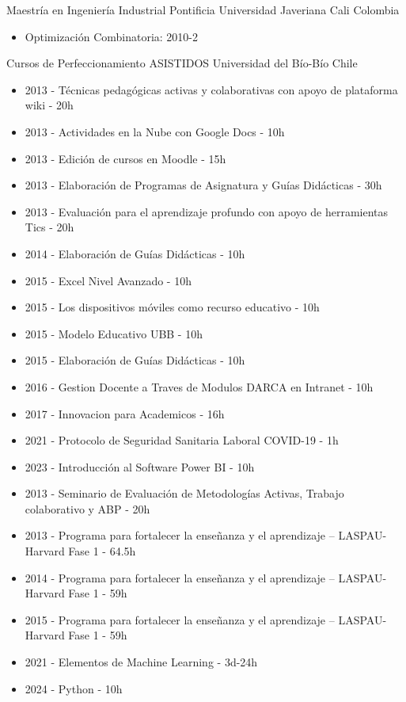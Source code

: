 
{Maestr\'ia en Ingenier\'ia Industrial}
{Pontificia Universidad Javeriana Cali}
{Colombia}
{}
{\begin{itemize}
\item Optimizaci\'on Combinatoria: 2010-2
\end{itemize}}


{Cursos de Perfeccionamiento ASISTIDOS}
{Universidad del B\'io-B\'io}
{Chile}
{}
{\begin{itemize}
\item 2013 - T\'ecnicas pedag\'ogicas activas y colaborativas con apoyo de plataforma wiki - 20h
\item 2013 - Actividades en la Nube con Google Docs - 10h
\item 2013 - Edici\'on de cursos en Moodle - 15h
\item 2013 - Elaboraci\'on de Programas de Asignatura y Gu\'ias Did\'acticas - 30h
\item 2013 - Evaluaci\'on para el aprendizaje profundo con apoyo de herramientas Tics - 20h
\item 2014 - Elaboraci\'on de Gu\'ias Did\'acticas - 10h
\item 2015 - Excel Nivel Avanzado - 10h
\item 2015 - Los dispositivos m\'oviles como recurso educativo - 10h
\item 2015 - Modelo Educativo UBB - 10h
\item 2015 - Elaboraci\'on de Gu\'ias Did\'acticas - 10h
\item 2016 - Gestion Docente a Traves de Modulos DARCA en Intranet - 10h
\item 2017 - Innovacion para Academicos - 16h
\item 2021 - Protocolo de Seguridad Sanitaria Laboral COVID-19 - 1h
\item 2023 - Introducción al Software Power BI - 10h
\item 2013 - Seminario de Evaluaci\'on de Metodolog\'ias Activas, Trabajo colaborativo y ABP - 20h
\item 2013 - Programa para fortalecer la enseñanza y el aprendizaje – LASPAU-Harvard Fase 1 - 64.5h
\item 2014 - Programa para fortalecer la enseñanza y el aprendizaje – LASPAU-Harvard Fase 1 - 59h
\item 2015 - Programa para fortalecer la enseñanza y el aprendizaje – LASPAU-Harvard Fase 1 - 59h
\item 2021 - Elementos de Machine Learning - 3d-24h
\item 2024 - Python - 10h
\end{itemize}}

\clearpage
